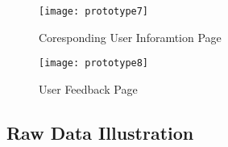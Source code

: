 \begin{figure}[h]
\caption{Coresponding User Inforamtion Page}
\label{figure:8-7}
\centering
\texttt{[image: prototype7]}
\end{figure}

\begin{figure}[h]
\caption{User Feedback Page}
\label{figure:8-8}
\centering
\texttt{[image: prototype8]}
\end{figure}

\subsection{Raw Data Illustration}

\cleardoublepage